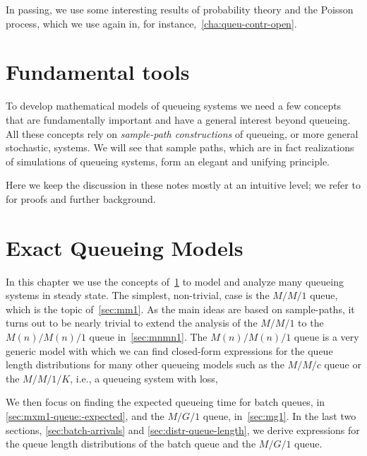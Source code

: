 In passing, we use some interesting results of probability theory and the Poisson process, which we use again in, for instance,~\cref{cha:queu-contr-open}.







\chapter{Fundamental tools}
\label{cha:fundamental-tools}


To develop mathematical models of queueing systems we need a few concepts that are fundamentally important and have a general interest beyond queueing.
All these concepts rely on \emph{sample-path constructions} of queueing, or more general stochastic, systems.
We will see that sample paths, which are in fact realizations of simulations of queueing systems, form an elegant and unifying principle.

Here we keep the discussion in these notes mostly at an intuitive level; we refer to \cite{el-taha98:_sampl_path_analy_queuein_system} for proofs and further background.








\chapter{Exact Queueing Models}
\label{cha:analytical-models}

In this chapter we use the concepts of~\cref{cha:fundamental-tools} to model and analyze many queueing systems in steady state.
The simplest, non-trivial, case is the $M/M/1$ queue, which is the topic of~\cref{sec:mm1}.
As the main ideas are based on sample-paths, it turns out to be  nearly trivial to extend the analysis of the $M/M/1$ to the $M(n)/M(n)/1$ queue in~\cref{sec:mnmn1}.
The $M(n)/M(n)/1$ queue is a very generic model  with which we can find closed-form expressions for the queue length distributions for many other queueing models such as the $M/M/c$ queue or the $M/M/1/K$, i.e., a queueing system with loss,

We then focus on finding the expected queueing time for batch queues, in \cref{sec:mxm1-queue:-expected}, and the $M/G/1$ queue, in~\cref{sec:mg1}.
In the last two sections,  \cref{sec:batch-arrivals} and \cref{sec:distr-queue-length}, we derive expressions for the queue length distributions of the batch queue and the $M/G/1$ queue.

